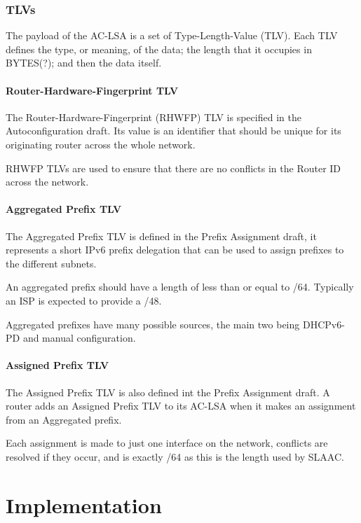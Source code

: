 \documentclass[12pt]{report}
\begin{document}
\subsection{TLVs}
The payload of the AC-LSA is a set of Type-Length-Value (TLV). Each TLV
defines the type, or meaning, of the data; the length that it occupies in
BYTES(?); and then the data itself. 

\subsubsection{Router-Hardware-Fingerprint TLV}
The Router-Hardware-Fingerprint (RHWFP) TLV is specified in the
Autoconfiguration draft. Its value is an identifier that should be unique for
its originating router across the whole network. 

RHWFP TLVs are used to ensure that there are no conflicts in the Router ID
across the network.

\subsubsection{Aggregated Prefix TLV}
The Aggregated Prefix TLV is defined in the Prefix Assignment draft, it
represents a short IPv6 prefix delegation that can be used to assign prefixes
to the different subnets. 

An aggregated prefix should have a length of less than or equal to /64.
Typically an ISP is expected to provide a /48.

Aggregated prefixes have many possible sources, the main two being DHCPv6-PD and
manual configuration. 

\subsubsection{Assigned Prefix TLV}
The Assigned Prefix TLV is also defined int the Prefix Assignment draft. A
router adds an Assigned Prefix TLV to its AC-LSA when it makes an assignment
from an Aggregated prefix.  

Each assignment is made to just one interface on the network, conflicts are
resolved if they occur, and is exactly /64 as this is the length used by SLAAC.

\chapter{Implementation}
\end{document}

